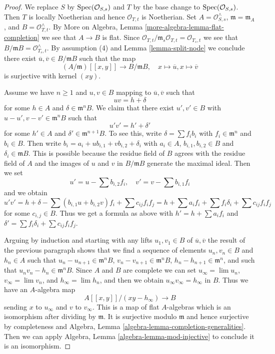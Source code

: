 \begin{proof}
We replace $S$ by $\mathop{\mathrm{Spec}}(\mathcal{O}_{S, s})$ and $T$ by the base change
to $\mathop{\mathrm{Spec}}(\mathcal{O}_{S, s})$. Then $T$ is locally Noetherian and hence
$\mathcal{O}_{T, t}$ is Noetherian.
Set $A = \mathcal{O}_{S, s}^\wedge$, $\mathfrak m = \mathfrak m_A$, and
$B = \mathcal{O}_{T, t}^\wedge$. By
More on Algebra, Lemma \ref{more-algebra-lemma-flat-completion}
we see that $A \to B$ is flat. Since
$\mathcal{O}_{T, t}/\mathfrak m_s \mathcal{O}_{T, t} = \mathcal{O}_{T_s, t}$
we see that $B/\mathfrak m B = \mathcal{O}_{T_s, t}^\wedge$.
By assumption (4) and Lemma \ref{lemma-split-node}
we conclude there exist $\overline{u}, \overline{v} \in B/\mathfrak m B$
such that the map
$$
(A/\mathfrak m)[[x, y]] \longrightarrow B/\mathfrak m B,\quad
x \longmapsto \overline{u},
x \longmapsto \overline{v}
$$
is surjective with kernel $(xy)$.

\medskip\noindent
Assume we have $n \geq 1$ and $u, v \in B$ mapping to
$\overline{u}, \overline{v}$ such that
$$
u v = h + \delta
$$
for some $h \in A$ and $\delta \in \mathfrak m^nB$.
We claim that there exist $u', v' \in B$ with
$u - u', v - v' \in \mathfrak m^n B$ such that
$$
u' v' = h' + \delta'
$$
for some $h' \in A$ and $\delta' \in \mathfrak m^{n + 1}B$.
To see this, write $\delta = \sum f_i b_i$ with
$f_i \in \mathfrak m^n$ and $b_i \in B$. Then write
$b_i = a_i + u b_{i, 1} + v b_{i, 2} + \delta_i$ with
$a_i \in A$, $b_{i, 1}, b_{i, 2} \in B$ and $\delta_i \in \mathfrak m B$.
This is possible because the residue field of $B$ agrees with the
residue field of $A$ and the images of $u$ and $v$ in $B/\mathfrak m B$
generate the maximal ideal. Then we set
$$
u' = u - \sum b_{i, 2}f_i,\quad
v' = v - \sum b_{i, 1}f_i
$$
and we obtain
$$
u'v' = h + \delta - \sum (b_{i, 1}u + b_{i, 2}v)f_i + \sum
c_{ij}f_if_j =
h + \sum a_if_i + \sum f_i \delta_i + \sum c_{ij}f_if_j
$$
for some $c_{i, j} \in B$.
Thus we get a formula as above with $h' = h + \sum a_if_i$
and $\delta' = \sum f_i \delta_i + \sum c_{ij}f_if_j$.

\medskip\noindent
Arguing by induction and starting with any lifts $u_1, v_1 \in B$
of $\overline{u}, \overline{v}$ the result of the previous paragraph
shows that we find a sequence of elements
$u_n, v_n \in B$ and $h_n \in A$ such that
$u_n - u_{n + 1} \in \mathfrak m^n B$,
$v_n - v_{n + 1} \in \mathfrak m^n B$,
$h_n - h_{n + 1} \in \mathfrak m^n$,
and such that $u_n v_n - h_n \in \mathfrak m^n B$.
Since $A$ and $B$ are complete we can set
$u_\infty = \lim u_n$, $v_\infty = \lim v_n$,  and
$h_\infty = \lim h_n$, and then we obtain $u_\infty v_\infty = h_\infty$
in $B$. Thus we have an $A$-algebra map
$$
A[[x, y]]/(xy - h_\infty) \longrightarrow B
$$
sending $x$ to $u_\infty$ and $v$ to $v_\infty$.
This is a map of flat $A$-algebras which is an
isomorphism after dividing by $\mathfrak m$.
It is surjective modulo $\mathfrak m$ and hence surjective
by completeness and
Algebra, Lemma \ref{algebra-lemma-completion-generalities}.
Then we can apply Algebra, Lemma \ref{algebra-lemma-mod-injective}
to conclude it is an isomorphism.
\end{proof}


